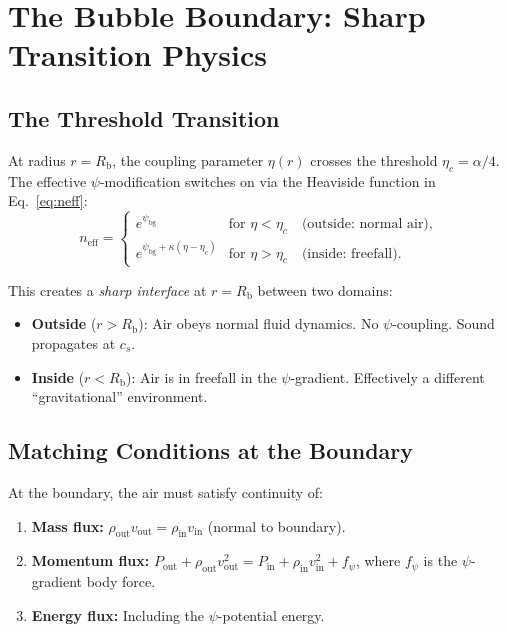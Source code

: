 \documentclass[12pt, letterpaper]{article}
\theoremstyle{definition}
\theoremstyle{remark}
\newcommand{\neff}{n_{\mathrm{eff}}}
\newcommand{\etac}{\eta_c}
\newcommand{\Rbub}{R_{\mathrm{b}}}
\newcommand{\cs}{c_s}
\begin{document}
\section{The Bubble Boundary: Sharp Transition Physics}
\label{sec:boundary}

\subsection{The Threshold Transition}

At radius $r = \Rbub$, the coupling parameter $\eta(r)$ crosses the threshold
$\etac = \alpha/4$. The effective $\psi$-modification switches on via the
Heaviside function in Eq.~\eqref{eq:neff}:
\begin{equation}
\neff = \begin{cases}
e^{\psi_{\mathrm{bg}}} & \text{for } \eta < \etac \quad \text{(outside: normal air)}, \\
e^{\psi_{\mathrm{bg}} + \kappa(\eta - \etac)} & \text{for } \eta > \etac \quad \text{(inside: freefall)}.
\end{cases}
\label{eq:threshold-transition}
\end{equation}

This creates a \emph{sharp interface} at $r = \Rbub$ between two domains:
\begin{itemize}
\item \textbf{Outside} ($r > \Rbub$): Air obeys normal fluid dynamics. No
$\psi$-coupling. Sound propagates at $\cs$.
\item \textbf{Inside} ($r < \Rbub$): Air is in freefall in the $\psi$-gradient.
Effectively a different ``gravitational'' environment.
\end{itemize}

\subsection{Matching Conditions at the Boundary}

At the boundary, the air must satisfy continuity of:
\begin{enumerate}
\item \textbf{Mass flux:} $\rho_{\mathrm{out}} v_{\mathrm{out}} = \rho_{\mathrm{in}} v_{\mathrm{in}}$ (normal to boundary).
\item \textbf{Momentum flux:} $P_{\mathrm{out}} + \rho_{\mathrm{out}} v_{\mathrm{out}}^2
= P_{\mathrm{in}} + \rho_{\mathrm{in}} v_{\mathrm{in}}^2 + f_\psi$, where $f_\psi$
is the $\psi$-gradient body force.
\item \textbf{Energy flux:} Including the $\psi$-potential energy.
\end{enumerate}
\end{document}
